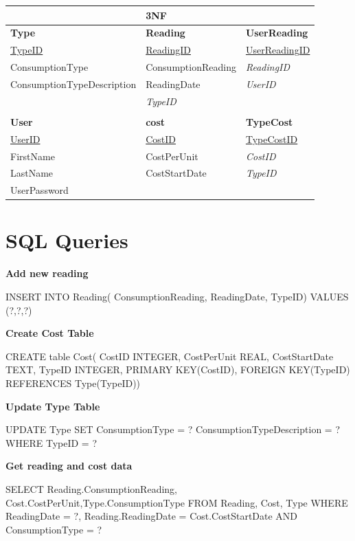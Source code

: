 \begin{center}
	\begin{tabular}{|p{5cm}|p{4cm}|p{3.5cm}|}
		\hline
		 & \textbf{3NF} & \\ \hline
		\textbf{Type} & \textbf{Reading} & \textbf{UserReading} \\ \hline
		\underline{TypeID} & \underline{ReadingID} & \underline{UserReadingID} \\ \hline
		ConsumptionType & ConsumptionReading & \emph{ReadingID} \\ \hline
		ConsumptionTypeDescription & ReadingDate & \emph{UserID} \\ \hline
		 & \emph{TypeID} & \\ \hline
		 & & \\ \hline
		\textbf{User} & \textbf{cost} & \textbf{TypeCost} \\ \hline
		\underline{UserID} & \underline{CostID} & \underline{TypeCostID} \\ \hline
		FirstName & CostPerUnit & \emph{CostID} \\ \hline
		LastName & CostStartDate & \emph{TypeID} \\ \hline
		UserPassword & & \\ \hline
	\end{tabular}
\end{center}

\section{SQL Queries}
\textbf{Add new reading}
\begin{sql}
INSERT INTO Reading(
    ConsumptionReading,
    ReadingDate,
    TypeID) 
    VALUES (?,?,?)
\end{sql}

\textbf{Create Cost Table}
\begin{sql}
CREATE table Cost(
    CostID INTEGER,
    CostPerUnit REAL,
    CostStartDate TEXT,
    TypeID INTEGER,
    PRIMARY KEY(CostID),
    FOREIGN KEY(TypeID) REFERENCES Type(TypeID))
\end{sql}

\textbf{Update Type Table}
\begin{sql}
UPDATE Type SET
ConsumptionType = ?
ConsumptionTypeDescription = ?
WHERE TypeID = ?
\end{sql}

\textbf{Get reading and cost data}
\begin{sql}
SELECT Reading.ConsumptionReading, Cost.CostPerUnit,Type.ConsumptionType
FROM Reading, Cost, Type
WHERE ReadingDate = ?,
Reading.ReadingDate = Cost.CostStartDate AND
ConsumptionType = ?
\end{sql}

